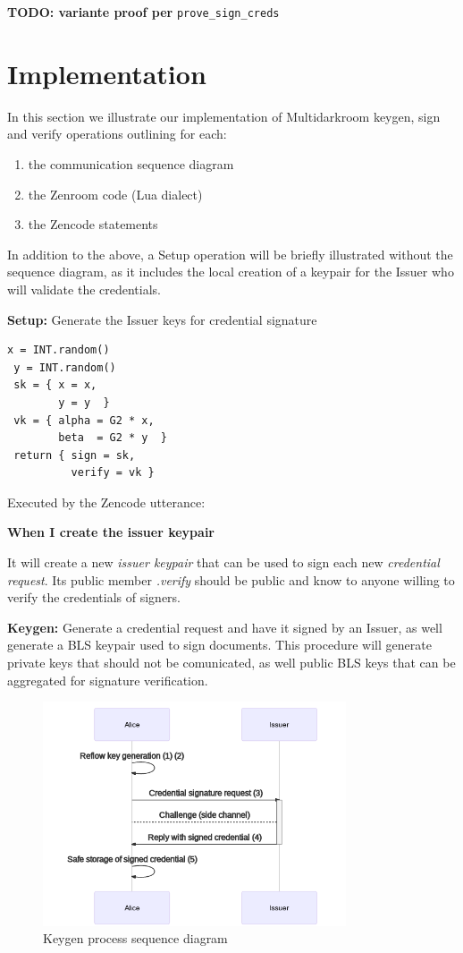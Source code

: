 \documentclass{article}
\begin{document}
\textbf{TODO: variante proof per} \verb!prove_sign_creds!

\section{Implementation}
\label{sec:implementation}

In this section we illustrate our implementation of Multidarkroom
keygen, sign and verify operations outlining for each:

\begin{enumerate}
  \item the communication sequence diagram
  \item the Zenroom code (Lua dialect)
  \item the Zencode statements
\end{enumerate}

In addition to the above, a Setup operation will be briefly
illustrated without the sequence diagram, as it includes the local
creation of a keypair for the Issuer who will validate the
credentials.

\textbf{Setup:} Generate the Issuer keys for credential signature

\begin{lstlisting}[style=lua]
 x = INT.random()
 y = INT.random()
 sk = { x = x,
        y = y  }
 vk = { alpha = G2 * x,
        beta  = G2 * y  }
 return { sign = sk,
          verify = vk }
\end{lstlisting}

Executed by the Zencode utterance:

\textbf{When I create the issuer keypair}

It will create a new \emph{issuer keypair} that can be used to sign
each new \emph{credential request}. Its public member \emph{.verify}
should be public and know to anyone willing to verify the credentials
of signers.

\textbf{Keygen:} Generate a credential request and have it signed by
an Issuer, as well generate a BLS keypair used to sign documents. This
procedure will generate private keys that should not be comunicated,
as well public BLS keys that can be aggregated for signature
verification.

\begin{figure}
  \caption{Keygen process sequence diagram}
  \centering
  \includegraphics[width=0.8\textwidth]{keygen-seq}
\end{figure}
\end{document}
